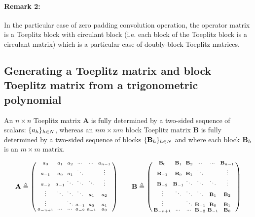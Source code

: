 \paragraph{Remark 2: } In the particular case of zero padding convolution operation, the operator matrix is a Toeplitz block with circulant block (i.e. each block of the Toeplitz block is a circulant matrix) which is a particular case of doubly-block Toeplitz matrices. 

\subsection{Generating a Toeplitz matrix and block Toeplitz matrix from a trigonometric polynomial}
An $n\times n$ Toeplitz matrix $\mathbf A$ is fully determined by a two-sided sequence of scalars: $\{a_h\}_{h \in N}$, whereas an $nm\times nm$ block Toeplitz matrix $\mathbf B$ is fully determined by a two-sided sequence of blocks $\{\mathbf B_h\}_{h \in N}$ and where each block $\mathbf B_h$ is an $m \times m$ matrix.  

\begin{equation}
    \mathbf{A} \triangleq  \begin{psmallmatrix}
      a_0 & a_{1}   & a_{2} & \cdots & \cdots & a_{n-1}  \\
      a_{-1} & a_0 & a_{1} & \ddots & & \vdots \\
      a_{-2} & a_{-1} & \ddots & \ddots & \ddots & \vdots \\ 
     \vdots & \ddots & \ddots & \ddots & a_{1} & a_{2}\\
     \vdots & & \ddots & a_{-1} & a_{0} & a_{1} \\
    a_{-n+1} & \cdots & \cdots & a_{-2} & a_{-1} & a_0
    \end{psmallmatrix} \quad \quad
    \mathbf{B} \triangleq  \begin{psmallmatrix}
      \mathbf{B}_0 & \mathbf{B}_{1}   & \mathbf{B}_{2} & \cdots & \cdots & \mathbf{B}_{n-1}  \\
      \mathbf{B}_{-1} & \mathbf{B}_0 & \mathbf{B}_{1} & \ddots & & \vdots \\
      \mathbf{B}_{-2} & \mathbf{B}_{-1} & \ddots & \ddots & \ddots & \vdots \\ 
     \vdots & \ddots & \ddots & \ddots & \mathbf{B}_{1} & \mathbf{B}_{2}\\
     \vdots & & \ddots & \mathbf{B}_{-1} & \mathbf{B}_{0} & \mathbf{B}_{1} \\
    \mathbf{B}_{-n+1} & \cdots & \cdots & \mathbf{B}_{-2} & \mathbf{B}_{-1} & \mathbf{B}_0
    \end{psmallmatrix}
\end{equation}

